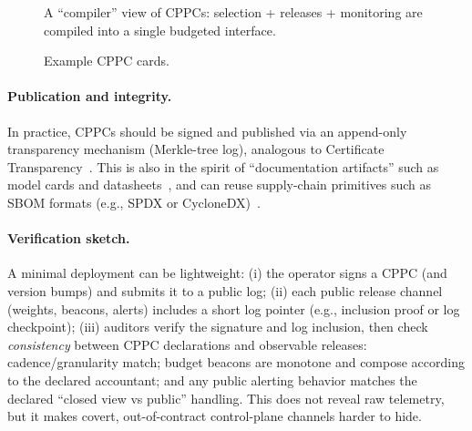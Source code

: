 \documentclass[11pt]{article}
\begin{document}
\begin{figure}[t]
  \centering
  \caption{A ``compiler'' view of CPPCs: selection + releases + monitoring are compiled into a single budgeted interface.}
\end{figure}

\begin{figure}[t]
  \centering
  \caption{Example CPPC cards.}
\end{figure}

\paragraph{Publication and integrity.}
In practice, CPPCs should be signed and published via an append-only transparency mechanism (Merkle-tree log),
analogous to Certificate Transparency~\cite{rfc9162_ct}.
This is also in the spirit of ``documentation artifacts'' such as model cards and datasheets~\cite{mitchell2019modelcards,gebru2021datasheets},
and can reuse supply-chain primitives such as SBOM formats (e.g., SPDX or CycloneDX)~\cite{spdx_overview,cyclonedx_overview}.

\paragraph{Verification sketch.}
A minimal deployment can be lightweight:
(i) the operator signs a CPPC (and version bumps) and submits it to a public log;
(ii) each public release channel (weights, beacons, alerts) includes a short log pointer (e.g., inclusion proof or log checkpoint);
(iii) auditors verify the signature and log inclusion, then check \emph{consistency} between CPPC declarations and observable releases:
cadence/granularity match; budget beacons are monotone and compose according to the declared accountant; and any public alerting behavior
matches the declared ``closed view vs public'' handling.
This does not reveal raw telemetry, but it makes covert, out-of-contract control-plane channels harder to hide.
\end{document}
